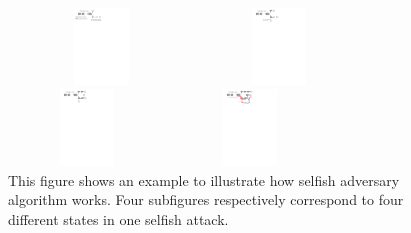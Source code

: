 \documentclass{llncs}
\begin{document}
\begin{figure}[!htbp] 
\begin{minipage}[t]{0.5\linewidth}  
\centering  
\includegraphics[height=0.8in, width=1.95in]{Figures/Selfish-Attack-1.pdf}
 
\end{minipage}%
\begin{minipage}[t]{0.5\linewidth}  
\centering  
\includegraphics[height=0.8in, width=1.65in]{Figures/Selfish-Attack-2.pdf}

\end{minipage}

\begin{minipage}[t]{0.5\linewidth}  
\centering  
\includegraphics[height=0.8in, width=1.65in]{Figures/Selfish-Attack-3.pdf}

\end{minipage}%
\begin{minipage}[t]{0.5\linewidth}  
\centering  
\includegraphics[height=0.8in, width=1.65in]{Figures/Selfish-Attack-4.pdf}

\end{minipage}   
\vspace{0mm}
\setlength{\belowcaptionskip}{-10pt}
\caption{This figure shows an example to illustrate how selfish adversary algorithm works. Four subfigures respectively correspond to four different states in one selfish attack.}
\label{selfish}
\vspace{-3mm}
\end{figure}
\end{document}
